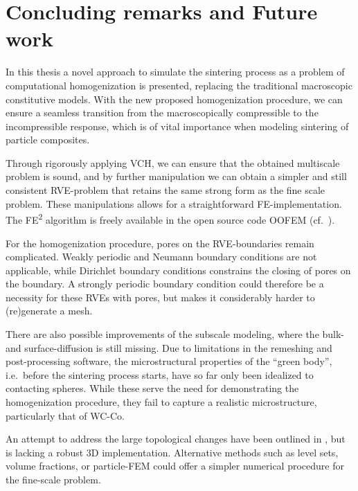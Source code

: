 \documentclass[MikaelDissertation.tex]{subfiles}
\begin{document}
\chapter{Concluding remarks and Future work}

In this thesis a novel approach to simulate the sintering process as a problem of computational homogenization is presented, replacing the traditional macroscopic constitutive models.
With the new proposed homogenization procedure, we can ensure a seamless transition from the macroscopically compressible to the incompressible response, which is of vital importance when modeling sintering of particle composites.

Through rigorously applying VCH, we can ensure that the obtained multiscale problem is sound, and by further manipulation we can obtain a simpler and still consistent RVE-problem that retains the same strong form as the fine scale problem.
These manipulations allows for a straightforward FE-implementation.
The FE\textsuperscript{2} algorithm is freely available in the open source code OOFEM (cf.\ \cite{patzak_oofem_2000}).

For the homogenization procedure, pores on the RVE-boundaries remain complicated.
Weakly periodic and Neumann boundary conditions are not applicable, while Dirichlet boundary conditions constrains the closing of pores on the boundary.
A strongly periodic boundary condition could therefore be a necessity for these RVEs with pores, but makes it considerably harder to (re)generate a mesh.


There are also possible improvements of the subscale modeling, where the bulk- and surface-diffusion is still missing.
Due to limitations in the remeshing and post-processing software, the microstructural properties of the ``green body'', i.e.\ before the sintering process starts, have so far only been idealized to contacting spheres.
While these serve the need for demonstrating the homogenization procedure, they fail to capture a realistic microstructure, particularly that of WC-Co.

An attempt to address the large topological changes have been outlined in , but is lacking a robust 3D implementation.
Alternative methods such as level sets, volume fractions, or particle-FEM could offer a simpler numerical procedure for the fine-scale problem.
\end{document}
